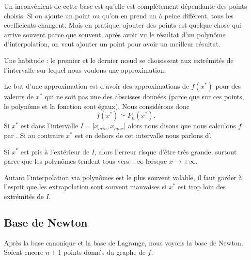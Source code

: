 Un inconvénient de cette base est qu'elle est complètement dépendante des points choisis. Si on ajoute un point ou qu'on en prend un à peine différent, tous les coefficients changent. Mais en pratique, ajouter des points est quelque chose qui arrive souvent parce que souvent, après avoir vu le résultat d'un polynôme d'interpolation, on veut ajouter un point pour avoir un meilleur résultat.

\begin{normaltext}
    Une habitude : le premier et le dernier nœud se choisissent aux extrémités de l'intervalle sur lequel nous voulons une approximation.

    Le but d'une approximation est d'avoir des approximations de \( f(x^*)\) pour des valeurs de \( x^*\) qui ne soit pas une des abscisses données (parce que sur ces points, le polynôme et la fonction sont égaux). Nous considérons donc
    \begin{equation}
        f(x^*)\simeq P_n(x^*).
    \end{equation}
    Si \( x^*\) est dans l'intervalle \( I= \mathopen[ x_{min} , x_{max} \mathclose]\) alors nous disons que nous calculons \( f\) par . Si au contraire \( x^*\) est en dehors de cet intervalle nous parlons d'.

    Si \( x^*\) est pris à l'extérieur de \( I\), alors l'erreur risque d'être très grande, surtout parce que les polynômes tendent tous vers \( \pm\infty\) lorsque \( x\to \pm\infty\).

    Autant l'interpolation via polynômes est le plus souvent valable, il faut garder à l'esprit que les extrapolation sont souvent mauvaises si \( x^*\) est trop loin des extrémités de \( I\).
\end{normaltext}

\subsection{Base de Newton}

Après la base canonique et la base de Lagrange, nous voyons la base de Newton. Soient encore \( n+1\) points donnés du graphe de \( f\). 

